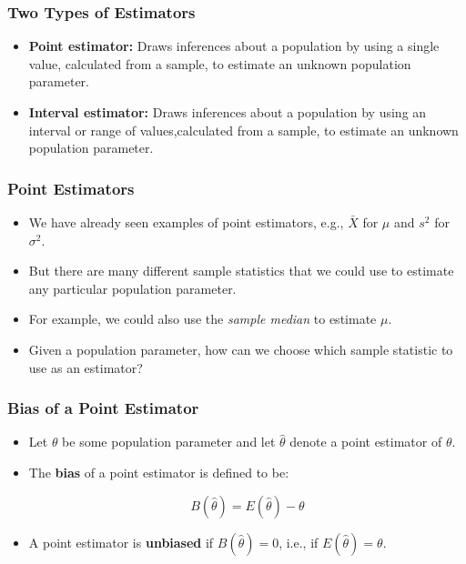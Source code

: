 \documentclass[12pt]{beamer}
\begin{document}
	\begin{frame}
	\frametitle{Two Types of Estimators}
	
	\begin{itemize}[label={\color{blue}$\blacktriangleright$}]
		\item {\bf Point estimator:} Draws inferences about a population by using a single value, calculated from a sample, to estimate an unknown population parameter.
		\item {\bf Interval estimator:} Draws inferences about a population by using an interval or range of values,calculated from a sample, to estimate an unknown population parameter.
	\end{itemize}
	
\end{frame}

\begin{frame}
	\frametitle{Point Estimators}
	
	\begin{itemize}[label={\color{blue}$\blacktriangleright$}]
		\item We have already seen examples of point estimators, e.g., $\bar{X}$ for $\mu$ and $s^2$ for $\sigma^2$.
		
		\item But there are many different sample statistics that we could use to estimate any particular population parameter.
		
		\item For example, we could also use the \textit{sample median} to estimate $\mu$.
		
		\item Given a population parameter, how can we choose which sample statistic to use as an estimator?
	\end{itemize}
	
\end{frame}
\begin{frame}
	\frametitle{Bias of a Point Estimator}
	
	\begin{itemize}[label={\color{blue}$\blacktriangleright$}]
		\item Let $\theta$ be some population parameter and let $\hat{\theta}$ denote a point estimator of $\theta$.
		
		\item The \textbf{bias} of a point estimator is defined to be:
		
		\[ B(\hat{\theta}) = E(\hat{\theta}) - \theta \]
		
		\item A point estimator is \textbf{unbiased} if $B(\hat{\theta}) = 0$, i.e., if $E(\hat{\theta}) = \theta$.
	\end{itemize}
	
\end{frame}
\end{document}
